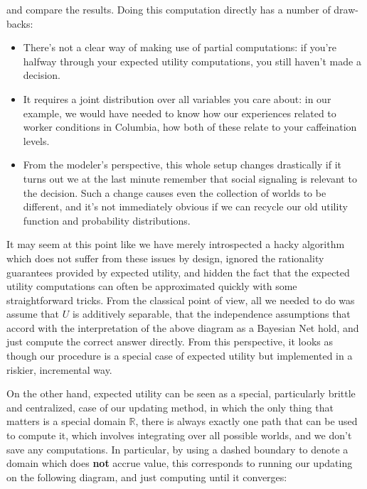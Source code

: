 \documentclass{article}
\theoremstyle{plain}
\theoremstyle{definition}
\theoremstyle{remark}
\begin{document}
	and compare the results. Doing this computation directly has a number of draw-backs:
	\begin{itemize}[nosep]
		\item There's not a clear way of making use of partial computations: if you're halfway through your expected utility computations, you still haven't made a decision.
		\item It requires a joint distribution over all variables you care about: in our example, we would have needed to know how our experiences related to worker conditions in Columbia, how both of these relate to your caffeination levels.
		
		\item From the modeler's perspective, this whole setup changes drastically if it turns out we at the last minute remember that social signaling is relevant to the decision. Such a change causes even the collection of worlds to be different, and it's not immediately obvious if we can recycle our old utility function and probability distributions.
		
	\end{itemize}
	
	It may seem at this point like we have merely introspected a hacky algorithm which does not suffer from these issues by design, ignored the rationality guarantees provided by expected utility, and hidden the fact that the expected utility computations can often be approximated quickly with some straightforward tricks. From the classical point of view, all we needed to do was assume that $U$ is additively separable, that the independence assumptions that accord with the interpretation of the above diagram as a Bayesian Net hold, and just compute the correct answer directly. From this perspective, it looks as though our procedure is a special case of expected utility but implemented in a riskier, incremental way. 
	
	On the other hand, expected utility can be seen as a special, particularly brittle and centralized, case of our updating method, in which the only thing that matters is a special domain $\mathbb R$, there is always exactly one path that can be used to compute it, which involves integrating over all possible worlds, and we don't save any computations. In particular, by using a dashed boundary to denote a domain which does \textbf{not} accrue value, this corresponds to running our updating on the following diagram, and just computing until it converges:\\
	
\end{document}
